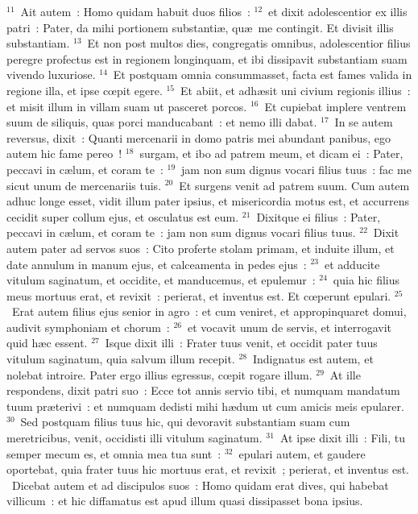 ${}^{11}$~Ait autem~: Homo quidam habuit duos filios~:
${}^{12}$~et dixit adolescentior ex illis patri~: Pater, da mihi portionem substanti\ae , qu\ae\ me contingit. Et divisit illis substantiam.
${}^{13}$~Et non post multos dies, congregatis omnibus, adolescentior filius peregre profectus est in regionem longinquam, et ibi dissipavit substantiam suam vivendo luxuriose.
${}^{14}$~Et postquam omnia consummasset, facta est fames valida in regione illa, et ipse cœpit egere.
${}^{15}$~Et abiit, et adh\ae sit uni civium regionis illius~: et misit illum in villam suam ut pasceret porcos.
${}^{16}$~Et cupiebat implere ventrem suum de siliquis, quas porci manducabant~: et nemo illi dabat.
${}^{17}$~In se autem reversus, dixit~: Quanti mercenarii in domo patris mei abundant panibus, ego autem hic fame pereo~!
${}^{18}$~surgam, et ibo ad patrem meum, et dicam ei~: Pater, peccavi in c\ae lum, et coram te~:
${}^{19}$~jam non sum dignus vocari filius tuus~: fac me sicut unum de mercenariis tuis.
${}^{20}$~Et surgens venit ad patrem suum. Cum autem adhuc longe esset, vidit illum pater ipsius, et misericordia motus est, et accurrens cecidit super collum ejus, et osculatus est eum.
${}^{21}$~Dixitque ei filius~: Pater, peccavi in c\ae lum, et coram te~: jam non sum dignus vocari filius tuus.
${}^{22}$~Dixit autem pater ad servos suos~: Cito proferte stolam primam, et induite illum, et date annulum in manum ejus, et calceamenta in pedes ejus~:
${}^{23}$~et adducite vitulum saginatum, et occidite, et manducemus, et epulemur~:
${}^{24}$~quia hic filius meus mortuus erat, et revixit~: perierat, et inventus est. Et cœperunt epulari.
${}^{25}$~Erat autem filius ejus senior in agro~: et cum veniret, et appropinquaret domui, audivit symphoniam et chorum~:
${}^{26}$~et vocavit unum de servis, et interrogavit quid h\ae c essent.
${}^{27}$~Isque dixit illi~: Frater tuus venit, et occidit pater tuus vitulum saginatum, quia salvum illum recepit.
${}^{28}$~Indignatus est autem, et nolebat introire. Pater ergo illius egressus, cœpit rogare illum.
${}^{29}$~At ille respondens, dixit patri suo~: Ecce tot annis servio tibi, et numquam mandatum tuum pr\ae terivi~: et numquam dedisti mihi h\ae dum ut cum amicis meis epularer.
${}^{30}$~Sed postquam filius tuus hic, qui devoravit substantiam suam cum meretricibus, venit, occidisti illi vitulum saginatum.
${}^{31}$~At ipse dixit illi~: Fili, tu semper mecum es, et omnia mea tua sunt~:
${}^{32}$~epulari autem, et gaudere oportebat, quia frater tuus hic mortuus erat, et revixit~; perierat, et inventus est.
~Dicebat autem et ad discipulos suos~: Homo quidam erat dives, qui habebat villicum~: et hic diffamatus est apud illum quasi dissipasset bona ipsius.
